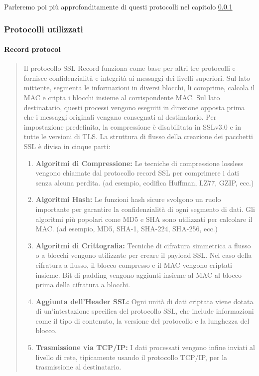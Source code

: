 \documentclass{article}
\theoremstyle{definition}
\begin{document}
Parleremo poi più approfonditamente di questi protocolli nel capitolo \ref{protocolli}




\subsubsection{Protocolli utilizzati}\label{protocolli}
\paragraph{Record protocol}
\begin{quote}
Il protocollo SSL Record funziona come base per altri tre protocolli e fornisce confidenzialità e integrità ai messaggi dei livelli superiori. Sul lato mittente, segmenta le informazioni in diversi blocchi, li comprime, calcola il MAC e cripta i blocchi insieme al corrispondente MAC. Sul lato destinatario, questi processi vengono eseguiti in direzione opposta prima che i messaggi originali vengano consegnati al destinatario. Per impostazione predefinita, la compressione è disabilitata in SSLv3.0 e in tutte le versioni di TLS. La struttura di flusso della creazione dei pacchetti SSL è divisa in cinque parti:

\begin{enumerate}
    \item \textbf{Algoritmi di Compressione:} Le tecniche di compressione lossless vengono chiamate dal protocollo record SSL per comprimere i dati senza alcuna perdita. (ad esempio, codifica Huffman, LZ77, GZIP, ecc.)
    \item \textbf{Algoritmi Hash:} Le funzioni hash sicure svolgono un ruolo importante per garantire la confidenzialità di ogni segmento di dati. Gli algoritmi più popolari come MD5 e SHA sono utilizzati per calcolare il MAC. (ad esempio, MD5, SHA-1, SHA-224, SHA-256, ecc.)
    \item \textbf{Algoritmi di Crittografia:} Tecniche di cifratura simmetrica a flusso o a blocchi vengono utilizzate per creare il payload SSL. Nel caso della cifratura a flusso, il blocco compresso e il MAC vengono criptati insieme. Bit di padding vengono aggiunti insieme al MAC al blocco prima della cifratura a blocchi.
    \item \textbf{Aggiunta dell'Header SSL:} Ogni unità di dati criptata viene dotata di un'intestazione specifica del protocollo SSL, che include informazioni come il tipo di contenuto, la versione del protocollo e la lunghezza del blocco.
    \item \textbf{Trasmissione via TCP/IP:} I dati processati vengono infine inviati al livello di rete, tipicamente usando il protocollo TCP/IP, per la trasmissione al destinatario. \cite{sslprot}
\end{enumerate}
\end{quote}
\end{document}
